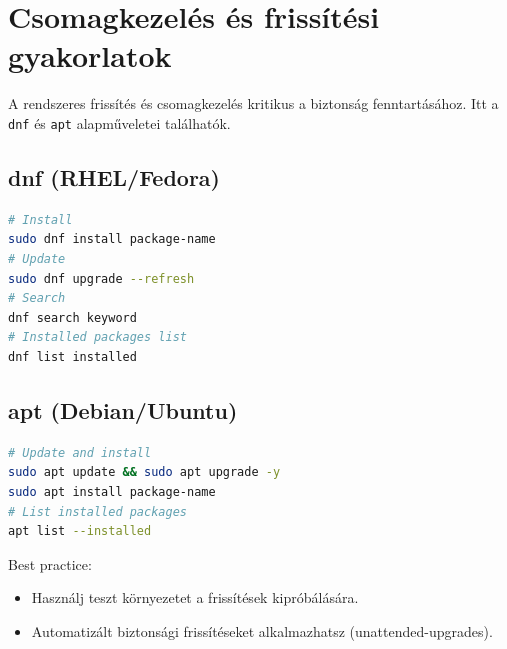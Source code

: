 \section{Csomagkezelés és frissítési gyakorlatok}

A rendszeres frissítés és csomagkezelés kritikus a biztonság fenntartásához. Itt a \texttt{dnf} és \texttt{apt} alapműveletei találhatók.

\subsection{dnf (RHEL/Fedora)}
\begin{lstlisting}[language=bash]
# Install
sudo dnf install package-name
# Update
sudo dnf upgrade --refresh
# Search
dnf search keyword
# Installed packages list
dnf list installed
\end{lstlisting}

\subsection{apt (Debian/Ubuntu)}
\begin{lstlisting}[language=bash]
# Update and install
sudo apt update && sudo apt upgrade -y
sudo apt install package-name
# List installed packages
apt list --installed
\end{lstlisting}

Best practice:
\begin{itemize}
  \item Használj teszt környezetet a frissítések kipróbálására.
  \item Automatizált biztonsági frissítéseket alkalmazhatsz (unattended-upgrades).
\end{itemize}
